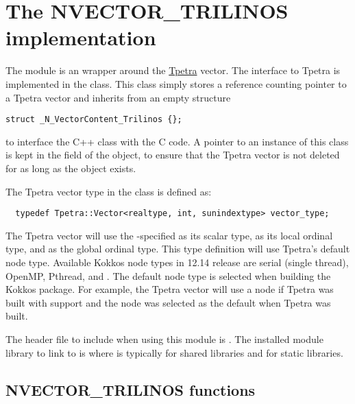 %
\section{The NVECTOR\_TRILINOS implementation}\label{ss:nvec_trilinos}

The {\nvectrilinos} module is an {\nvector} wrapper around the {\trilinos}
\href{https://github.com/trilinos/Trilinos}{Tpetra} vector. The interface
to Tpetra is implemented in the  class. This
class simply stores a reference counting pointer to a Tpetra vector and
inherits from an empty structure
\begin{verbatim}
struct _N_VectorContent_Trilinos {};
\end{verbatim}
to interface the C++ class with the {\nvector} C code.
A pointer to an instance of this class is kept in the  field
of the  object, to ensure that the Tpetra vector
is not deleted for as long as the  object exists.

The Tpetra vector type in the  class is defined
as:
\begin{verbatim}
  typedef Tpetra::Vector<realtype, int, sunindextype> vector_type;
\end{verbatim}
The Tpetra vector will use the {\sundials}-specified  as its scalar
type,  as its local ordinal type, and  as the global ordinal type.
This type definition will use Tpetra's default node type. Available Kokkos node
types in {\trilinos} 12.14 release are serial (single thread), OpenMP, Pthread,
and {\cuda}. The default node type is selected when building the Kokkos package.
For example, the Tpetra vector will use a {\cuda} node if Tpetra was built with
{\cuda} support and the {\cuda} node was selected as the default when Tpetra was
built.

The header file to include when using this module is .
The installed module library to link to is
where  is typically  for shared libraries and 
for static libraries.


\subsection{NVECTOR\_TRILINOS functions}
\label{ss:nvec_trilinos_functions}

